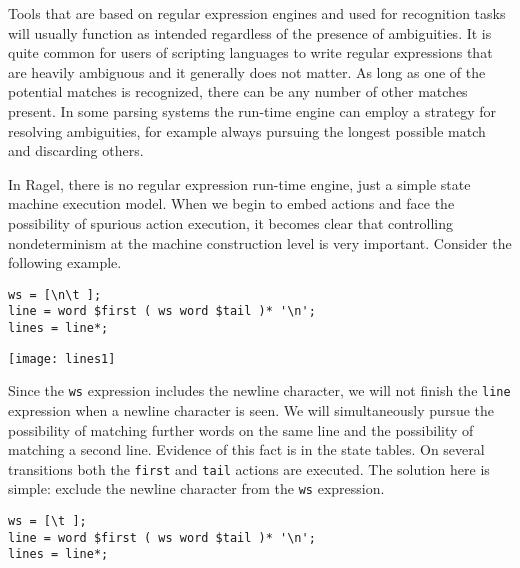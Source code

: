 \documentclass[letterpaper,11pt,oneside]{book}
\newcommand{\graphspace}{\vspace{10pt}}
\newenvironment{inline_code}{\def\baselinestretch{1}\vspace{12pt}\small}{}
\begin{document}
Tools that are based on regular expression engines and used for
recognition tasks will usually function as intended regardless of the presence
of ambiguities. It is quite common for users of scripting languages to write
regular expressions that are heavily ambiguous and it generally does not
matter. As long as one of the potential matches is recognized, there can be any
number of other matches present.  In some parsing systems the run-time engine
can employ a strategy for resolving ambiguities, for example always pursuing
the longest possible match and discarding others.

In Ragel, there is no regular expression run-time engine, just a simple state
machine execution model. When we begin to embed actions and face the
possibility of spurious action execution, it becomes clear that controlling
nondeterminism at the machine construction level is very important. Consider
the following example.

\begin{inline_code}
\begin{verbatim}
ws = [\n\t ];
line = word $first ( ws word $tail )* '\n';
lines = line*;
\end{verbatim}
\end{inline_code}

\begin{center}
\texttt{[image: lines1]}
\end{center}
\graphspace

Since the \verb|ws| expression includes the newline character, we will
not finish the \verb|line| expression when a newline character is seen. We will
simultaneously pursue the possibility of matching further words on the same
line and the possibility of matching a second line. Evidence of this fact is 
in the state tables. On several transitions both the \verb|first| and
\verb|tail| actions are executed.  The solution here is simple: exclude
the newline character from the \verb|ws| expression. 

\begin{inline_code}
\begin{verbatim}
ws = [\t ];
line = word $first ( ws word $tail )* '\n';
lines = line*;
\end{verbatim}
\end{inline_code}
\end{document}
